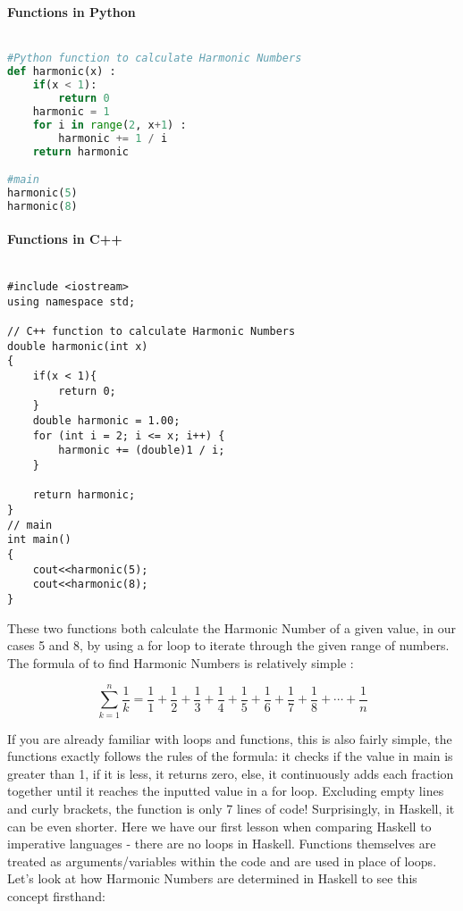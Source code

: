 \documentclass{article}
\begin{document}
\paragraph{Functions in Python}

\begin{lstlisting}[language=Python]

#Python function to calculate Harmonic Numbers
def harmonic(x) :
    if(x < 1):
        return 0
    harmonic = 1
    for i in range(2, x+1) :
        harmonic += 1 / i
    return harmonic

#main
harmonic(5)
harmonic(8)
\end{lstlisting}


\paragraph{Functions in C++}
\begin{lstlisting}

#include <iostream>
using namespace std;
 
// C++ function to calculate Harmonic Numbers
double harmonic(int x)
{
    if(x < 1){
        return 0;
    }
    double harmonic = 1.00;
    for (int i = 2; i <= x; i++) {
        harmonic += (double)1 / i;
    }
 
    return harmonic;
}
// main
int main()
{
    cout<<harmonic(5);
    cout<<harmonic(8);
}
\end{lstlisting}
\noindent
These two functions both calculate the Harmonic Number of a given value, in our cases 5 and 8, by using a for loop to iterate through the given range of numbers. The formula of to find Harmonic Numbers is relatively simple \cite{Harmonic Numbers}:

\[ \sum_{k=1}^{n}\frac{1}{k}  = \frac{1}{1} + \frac{1}{2} + \frac{1}{3} + \frac{1}{4} + \frac{1}{5} + \frac{1}{6} + \frac{1}{7} + \frac{1}{8} + \cdots + \frac{1}{n} \]

\noindent
If you are already familiar with loops and functions, this is also fairly simple, the functions exactly follows the rules of the formula: it checks if the value in main is greater than 1, if it is less, it returns zero, else, it continuously adds each fraction together until it reaches the inputted value in a for loop. Excluding empty lines and curly brackets, the function is only 7 lines of code! Surprisingly, in Haskell, it can be even shorter. Here we have our first lesson when comparing Haskell to imperative languages - there are no loops in Haskell. Functions themselves are treated as arguments/variables within the code and are used in place of loops. Let's look at how Harmonic Numbers are determined in Haskell to see this concept firsthand: 
\end{document}
